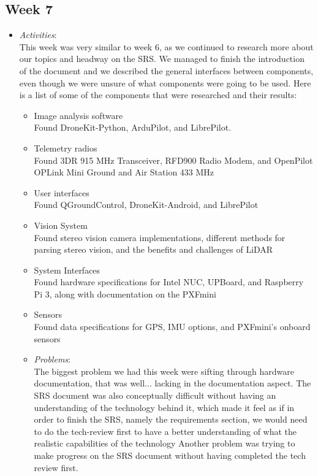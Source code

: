 \documentclass[compsoc,draftclsnofoot,onecolumn,10pt]{IEEEtran}
\begin{document}
\subsection{Week 7}
	\begin{itemize}
        \item \textit{Activities}:\\
        This week was very similar to week 6, as we continued to research more about our topics and headway on the SRS. 
        We managed to finish the introduction of the document and we described the general interfaces between components, even though we were unsure of what components were going to be used. 
        Here is a list of some of the components that were researched and their results:
        \begin{itemize}
        \item Image analysis software\\
	Found DroneKit-Python, ArduPilot, and LibrePilot.
	\item Telemetry radios \\
	Found 3DR 915 MHz Transceiver, RFD900 Radio Modem, and OpenPilot OPLink Mini Ground and Air Station 433 MHz
	\item User interfaces\\
	Found QGroundControl, DroneKit-Android, and LibrePilot
	\item Vision System \\
	Found stereo vision camera implementations, different methods for parsing stereo vision, and the benefits and challenges of LiDAR
	\item System Interfaces \\
	Found hardware specifications for Intel NUC, UPBoard, and Raspberry Pi 3, along with documentation on the PXFmini
	\item Sensors\\
	Found data specifications for GPS, IMU options, and PXFmini's onboard sensors
        
        \item \textit{Problems}:\\
        The biggest problem we had this week were sifting through hardware documentation, that was well... lacking in the documentation aspect. 
        The SRS document was also conceptually difficult without having an understanding of the technology behind it, which made it feel as if in order to finish the SRS, namely the requirements section, we would need to do the tech-review first to have a better understanding of what the realistic capabilities of the technology 
        Another problem was trying to make progress on the SRS document without having completed the tech review first.
        

\end{itemize}
\end{itemize}
\end{document}

